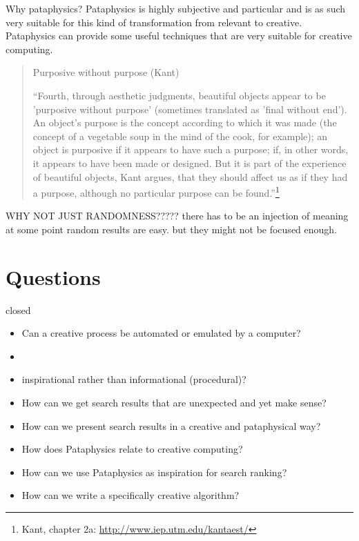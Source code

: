 \grule

Why pataphysics?
Pataphysics is highly subjective and particular and is as such very suitable for this kind of transformation from relevant to creative.
Pataphysics can provide some useful techniques that are very suitable for creative computing.

\begin{quote}
  Purposive without purpose (Kant)

  ``Fourth, through aesthetic judgments, beautiful objects appear to be 'purposive without purpose' (sometimes translated as 'final without end'). An object's purpose is the concept according to which it was made (the concept of a vegetable soup in the mind of the cook, for example); an object is purposive if it appears to have such a purpose; if, in other words, it appears to have been made or designed. But it is part of the experience of beautiful objects, Kant argues, that they should affect us as if they had a purpose, although no particular purpose can be found.''\footnote{Kant, chapter 2a: \url{http://www.iep.utm.edu/kantaest/}}
\end{quote}


WHY NOT JUST RANDOMNESS?????
there has to be an injection of meaning at some point
random results are easy. but they might not be focused enough.



\section{Questions}

closed
\begin{itemize}
  \item Can a creative process be automated or emulated by a computer?
  \item
  \item inspirational rather than informational (procedural)?
  \item How can we get search results that are unexpected and yet make sense?
  \item How can we present search results in a creative and pataphysical way?
  \item How does Pataphysics relate to creative computing?
  \item How can we use Pataphysics as inspiration for search ranking?
  \item How can we write a specifically creative algorithm?
\end{itemize}

